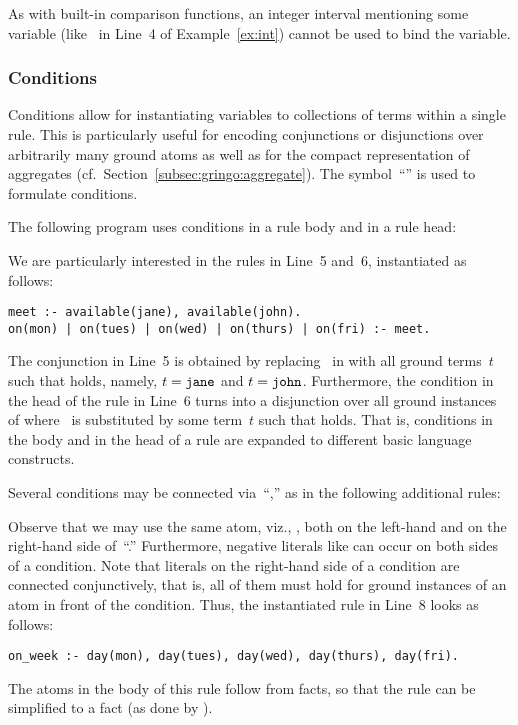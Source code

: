 As with built-in comparison functions,
an integer interval mentioning some variable (like~ in Line~4 of Example~\ref{ex:int})
cannot be used to bind the variable.


\subsubsection{Conditions}\label{subsec:gringo:condition}

Conditions allow for instantiating variables to
collections of terms within a single rule.
This is particularly useful for encoding conjunctions or disjunctions over
arbitrarily many ground atoms as well as for the compact representation of aggregates
(cf.\ Section~\ref{subsec:gringo:aggregate}).
The symbol~``\code{:}'' is used to formulate conditions.

\begin{example}\label{ex:cond}
The following program uses conditions in a rule body and in a rule head:
%

%
We are particularly interested in the rules in Line~5 and~6,
instantiated as follows:%
%
\begin{lstlisting}[firstnumber=5]
meet :- available(jane), available(john).
on(mon) | on(tues) | on(wed) | on(thurs) | on(fri) :- meet.
\end{lstlisting}
%
The conjunction in Line~5 is obtained by replacing~ in
 with all ground terms~$t$ such that
 holds, namely, $t=\texttt{jane}$ and $t=\texttt{john}$.
Furthermore, the condition in the head of the rule in Line~6 turns into
a disjunction over all ground instances of
 where~ is substituted by some term~$t$
such that
 holds.
That is, conditions in the body and in the head of a rule
are expanded to different basic language constructs.

Several conditions may be connected via~``\code{:},''
as in the following additional rules:
%

%
Observe that we may use the same atom, viz., ,
both on the left-hand and on the right-hand side of~``\code{:}.''
Furthermore, negative literals like 
can occur on both sides of a condition.
Note that literals on the right-hand side of a condition are connected conjunctively, that is,
all of them must hold for ground instances of an atom in front
of the condition.
Thus, the instantiated rule in Line~8 looks as follows:
%
\begin{lstlisting}[firstnumber=8]
on_week :- day(mon), day(tues), day(wed), day(thurs), day(fri).
\end{lstlisting}
%
The atoms in the body of this rule follow from facts, so that
the rule can be simplified to a fact 
(as done by \gringo).
\eexample
\end{example}

